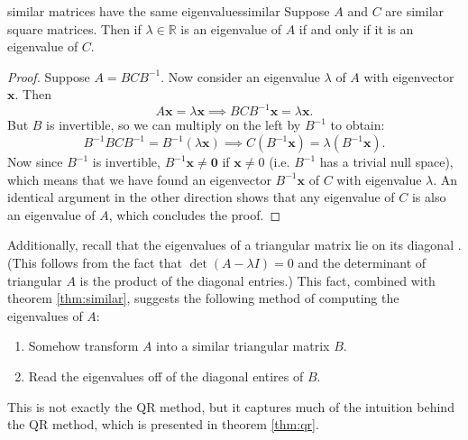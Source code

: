 \documentclass{article}
\let\vec\mathbf
\begin{document}
\begin{theorem}{similar matrices have the same eigenvalues}{similar}
  Suppose $A$ and $C$ are similar square matrices. Then if $\lambda \in \mathbb{R}$ is an eigenvalue of $A$ if and only if it is an eigenvalue of $C$.
  
\end{theorem}
\begin{proof}
  Suppose $A = BCB^{-1}$. Now consider an eigenvalue $\lambda$ of $A$ with eigenvector $\vec{x}$. Then
  \begin{equation*}
    A\vec{x} = \lambda\vec{x} \implies BCB^{-1}\vec{x} = \lambda\vec{x}.
  \end{equation*}
  But $B$ is invertible, so we can multiply on the left by $B^{-1}$ to obtain:
  \begin{equation*}
    B^{-1}BCB^{-1} = B^{-1}(\lambda\vec{x}) \implies C(B^{-1}\vec{x}) = \lambda(B^{-1}\vec{x}).
  \end{equation*}
  Now since $B^{-1}$ is invertible, $B^{-1}\vec{x} \neq \vec{0}$ if $\vec{x} \neq 0$ (i.e. $B^{-1}$ has a trivial null space), which means that we have found an eigenvector $B^{-1}\vec{x}$ of $C$ with eigenvalue $\lambda$. An identical argument in the other direction shows that any eigenvalue of $C$ is also an eigenvalue of $A$, which concludes the proof.
\end{proof}

Additionally, recall that the eigenvalues of a triangular matrix lie on its diagonal \cite[p.~294]{strang}. (This follows from the fact that $\det(A - \lambda I) = 0$ and the determinant of triangular $A$ is the product of the diagonal entries.) This fact, combined with theorem \ref{thm:similar}, suggests the following method \cite[p.~530]{strang} of computing the eigenvalues of $A$:
\begin{enumerate}
  \item Somehow transform $A$ into a similar triangular matrix $B$.
  \item Read the eigenvalues off of the diagonal entires of $B$.
\end{enumerate}
This is not exactly the QR method, but it captures much of the intuition behind the QR method, which is presented in theorem \ref{thm:qr}.
\end{document}
